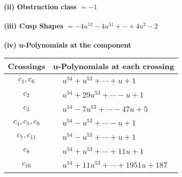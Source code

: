 \documentclass[1p]{elsarticle_modified}
\theoremstyle{definition}
\begin{document}
\flushleft \textbf{(ii) Obstruction class $= -1$}\\~\\
\flushleft \textbf{(iii) Cusp Shapes $= -4 u^{52}-4 u^{51}+\cdots+4 u^2-2$}\\~\\
\newpage\renewcommand{\arraystretch}{1}
\flushleft \textbf{(iv) u-Polynomials at the component}\newline \\
\begin{tabular}{m{50pt}|m{274pt}}
Crossings & \hspace{64pt}u-Polynomials at each crossing \\
\hline $$\begin{aligned}c_{1},c_{6}\end{aligned}$$&$\begin{aligned}
&u^{54}+u^{53}+\cdots+u+1
\end{aligned}$\\
\hline $$\begin{aligned}c_{2}\end{aligned}$$&$\begin{aligned}
&u^{54}+29 u^{53}+\cdots- u+1
\end{aligned}$\\
\hline $$\begin{aligned}c_{3}\end{aligned}$$&$\begin{aligned}
&u^{54}-7 u^{53}+\cdots-47 u+5
\end{aligned}$\\
\hline $$\begin{aligned}c_{4},c_{5},c_{9}\end{aligned}$$&$\begin{aligned}
&u^{54}- u^{53}+\cdots- u+1
\end{aligned}$\\
\hline $$\begin{aligned}c_{7},c_{11}\end{aligned}$$&$\begin{aligned}
&u^{54}- u^{53}+\cdots+u+1
\end{aligned}$\\
\hline $$\begin{aligned}c_{8}\end{aligned}$$&$\begin{aligned}
&u^{54}+u^{53}+\cdots+11 u+1
\end{aligned}$\\
\hline $$\begin{aligned}c_{10}\end{aligned}$$&$\begin{aligned}
&u^{54}+11 u^{53}+\cdots+1951 u+187
\end{aligned}$\\
\hline
\end{tabular}\\~\\
\end{document}
